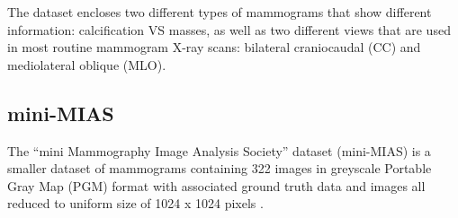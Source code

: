 The dataset encloses two different types of mammograms that show different information: calcification VS masses, as well as two different views that are used in most routine mammogram X-ray scans: bilateral craniocaudal (CC) and mediolateral oblique (MLO).

\subsection{mini-MIAS}

The ``mini Mammography Image Analysis Society'' dataset (mini-MIAS) is a smaller dataset of mammograms containing 322 images in greyscale Portable Gray Map (PGM) format with associated ground truth data \citep{Suckling1994} and images all reduced to uniform size of 1024 x 1024 pixels \citep{Vishrutha2014}.